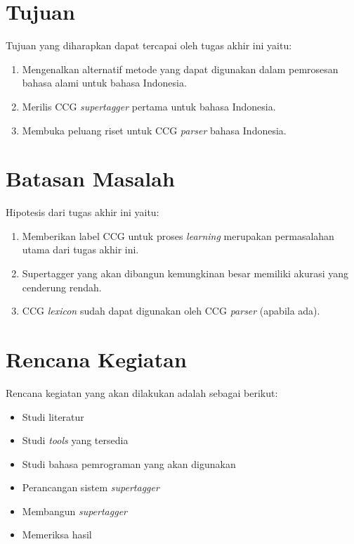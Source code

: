 \section{Tujuan}
Tujuan yang diharapkan dapat tercapai oleh tugas akhir ini yaitu:
\begin{enumerate}
    \item Mengenalkan alternatif metode yang dapat digunakan dalam pemrosesan bahasa alami untuk
      bahasa Indonesia.
    \item Merilis CCG \textit{supertagger} pertama untuk bahasa Indonesia.
    \item Membuka peluang riset untuk CCG \textit{parser} bahasa Indonesia.
\end{enumerate}
\section{Batasan Masalah}
Hipotesis dari tugas akhir ini yaitu:
\begin{enumerate}
    \item Memberikan label CCG untuk proses \textit{learning} merupakan permasalahan utama dari tugas akhir
        ini.
    \item Supertagger yang akan dibangun kemungkinan besar memiliki akurasi yang cenderung rendah.
    \item CCG \textit{lexicon} sudah dapat digunakan oleh CCG \textit{parser} (apabila ada).
\end{enumerate}

\section{Rencana Kegiatan}
Rencana kegiatan yang akan dilakukan adalah sebagai berikut:
\begin{itemize}
    \item Studi literatur
    \item Studi \textit{tools} yang tersedia
    \item Studi bahasa pemrograman yang akan digunakan
    \item Perancangan sistem \textit{supertagger}
    \item Membangun \textit{supertagger}
    \item Memeriksa hasil
\end{itemize}

